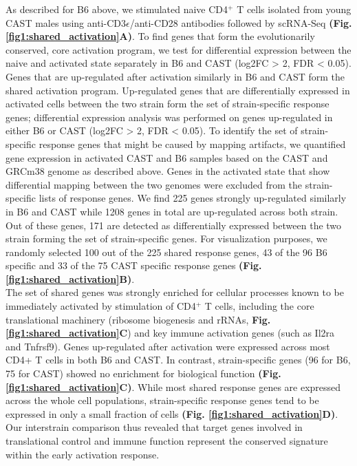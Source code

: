 As described for B6 above, we stimulated naive CD4$^+$ T cells isolated from young CAST males using anti-CD3$\epsilon$/anti-CD28 antibodies followed by scRNA-Seq \textbf{(Fig. \ref{fig1:shared_activation}A)}. To find genes that form the evolutionarily conserved, core activation program, we test for differential expression between the naive and activated state separately in B6 and CAST (log2FC > 2, FDR < 0.05). Genes that are up-regulated after activation similarly in B6 and CAST form the shared activation program. Up-regulated genes that are differentially expressed in activated cells between the two strain form the set of strain-specific response genes; differential expression analysis was performed on genes up-regulated in either B6 or CAST (log2FC > 2, FDR < 0.05). To identify the set of strain-specific response genes that might be caused by mapping artifacts, we quantified gene expression in activated CAST and B6 samples based on the CAST and GRCm38 genome as described above. Genes in the activated state that show differential mapping between the two genomes were excluded from the strain-specific lists of response genes. We find 225 genes strongly up-regulated similarly in B6 and CAST while 1208 genes in total are up-regulated across both strain. Out of these genes, 171 are detected as differentially expressed between the two strain forming the set of strain-specific genes. For visualization purposes, we randomly selected 100 out of the 225 shared response genes, 43 of the 96 B6 specific and 33 of the 75 CAST specific response genes \textbf{(Fig. \ref{fig1:shared_activation}B)}.\\

The set of shared genes was strongly enriched for cellular processes known to be immediately activated by stimulation of CD4$^+$ T cells, including the core translational machinery (ribosome biogenesis and rRNAs, \textbf{Fig. \ref{fig1:shared_activation}C}) and key immune activation genes (such as Il2ra and Tnfrsf9)\citep{Asmal2003}. Genes up-regulated after activation were expressed across most CD4+ T cells in both B6 and CAST. In contrast, strain-specific genes (96 for B6, 75 for CAST) showed no enrichment for biological function \textbf{(Fig. \ref{fig1:shared_activation}C)}. While most shared response genes are expressed across the whole cell populations, strain-specific response genes tend to be expressed in only a small fraction of cells \textbf{(Fig. \ref{fig1:shared_activation}D)}. \\

Our interstrain comparison thus revealed that target genes involved in translational control and immune function represent the conserved signature within the early activation response.


